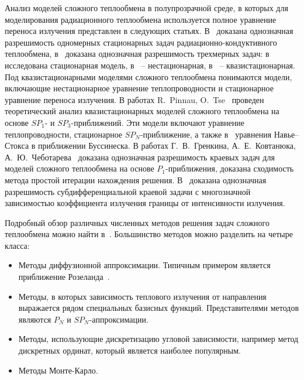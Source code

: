     Анализ моделей сложного теплообмена в полупрозрачной среде, в
    которых для моделирования радиационного теплообмена используется
    полное уравнение переноса излучения представлен в следующих статьях.
    В~\cite{asllanaj2003existence, kelley1996existence} доказана
    однозначная разрешимость одномерных стационарных
    задач радиационно-кондуктивного теплообмена,
    в~\cite{ghattassi2018existence, Porzio2004, Thompson2004} доказана
    однозначная разрешимость трехмерных задач: в~\cite{Thompson2004} исследована
    стационарная модель, в~\cite{Porzio2004} -- нестационарная,
    в~\cite{ghattassi2018existence} -- квазистационарная.
    Под квазистационарными моделями сложного теплообмена понимаются
    модели, включающие нестационарное уравнение теплопроводности и
    стационарное уравнение переноса излучения.
    В работах R.\ Pinnau, O.\ Tse~\cite{Pinnau2007, Pinnau2013}
    проведен теоретический анализ квазистационарных моделей сложного
    теплообмена на основе $SP_1$- и $SP_3$-приближений.
    Эти модели включают уравнение теплопроводности, стационарное $SP_N$-приближение, а также
    в~\cite{Pinnau2013} уравнения Навье–Стокса в приближении Буссинеска.
    В работах Г.\ В.\ Гренкина, А.\ Е.\ Ковтанюка,
    А.\ Ю.\ Чеботарева~\cite{Kovtanyuk2014, Kovtanyuk2016, Chebotarev22, Pak23}
    доказана однозначная разрешимость краевых задач для моделей
    сложного теплообмена на основе $P_1$-приближения, доказана сходимость
    метода простой итерации нахождения решения.
    В~\cite{Chebotarev2016Odnaznachnaya} доказана однозначная
    разрешимость субдифференциальной краевой задачи с многозначной
    зависимостью коэффициента излучения границы от интенсивности
    излучения.

    Подробный обзор различных численных методов решения задач сложного
    теплообмена можно найти в~\cite{modest2013radiative}.
    Большинство методов можно разделить на четыре класса:
    \begin{itemize}
        \item Методы диффузионной аппроксимации.
        Типичным примером является приближение Розеланда~\cite{farina2011mathematical, Siedow2011}.
        \item Методы, в которых зависимость теплового излучения от направления
        выражается рядом специальных базисных функций.
        Представителями методов являются $P_N$ и $SP_N$-аппроксимации.
        \item Методы, использующие дискретизацию угловой зависимости, например
        метод дискретных ординат, который является наиболее популярным.
        \item Методы Монте-Карло.
    \end{itemize}


